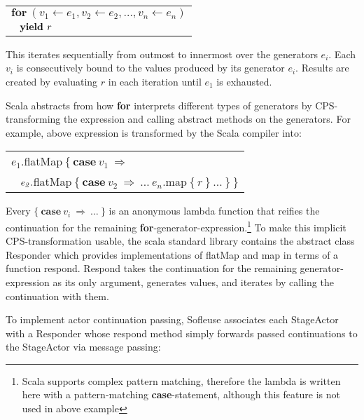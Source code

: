 \documentclass{sig-alternate}
\begin{document}
   
\medskip
\begin{tabular}{l} $\mathbf{for}\ (\mathit{v_1} \leftarrow \mathit{e_1}, \mathit{v_2} \leftarrow
\mathit{e_2}, \ldots, \mathit{v_n} \leftarrow \mathit{e_n})$\\ 
$\hspace{2ex}\mathbf{yield}\ \mathit{r}$
\end{tabular}
\medskip


This iterates sequentially from outmost to innermost over the generators $e_i$. Each $v_i$ is
consecutively bound to the values produced by its generator $e_i$. Results are created by evaluating
$r$ in each iteration until $e_1$ is exhausted.

Scala abstracts from how \textbf{for} interprets different types of generators by CPS-transforming
the expression and calling abstract methods on the generators. For example, above expression is
transformed by the Scala compiler into:


\medskip
\begin{tabular}{l}
$\mathit{e_1}.$flatMap$\ \{\ \mathbf{case}\ \mathit{v_1}\ \Rightarrow$\\
$\hspace{2ex}\mathit{e_2}.$flatMap$\ \{\ \mathbf{case}\ \mathit{v_2}\ \Rightarrow\ \ldots\ \mathit{e_n}.$map$\ \{\ \mathit{r}\ \}\ \ldots\ \}\ \}$
\end{tabular}
\medskip


Every $\{\ \mathbf{case}\ \mathit{v_i}\ \Rightarrow\ \ldots\ \}$ is an anonymous lambda function
that reifies the continuation for the remaining \textbf{for}-generator-expression.\footnote{Scala
supports complex pattern matching, therefore the lambda is written here with a pattern-matching
\textbf{case}-statement, although this feature is not used in above example} To make this implicit
CPS-transformation usable, the scala standard library contains the abstract class Responder which
provides implementations of flatMap and map in terms of a function respond. Respond takes the
continuation for the remaining generator-expression as its only argument, generates values, and
iterates by calling the continuation with them.

To implement actor continuation passing, Sofleuse associates each StageActor with a Responder whose
respond method simply forwards passed continuations to the StageActor via message passing:
                                                                                            
\end{document}
